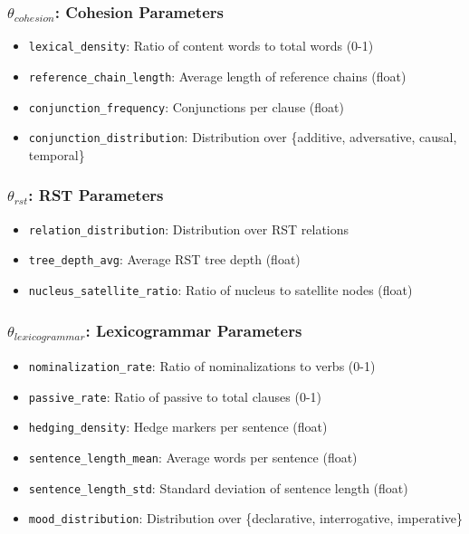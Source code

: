 \subsubsection{$\theta_{cohesion}$: Cohesion Parameters}

\begin{itemize}
    \item \texttt{lexical\_density}: Ratio of content words to total words (0-1)
    \item \texttt{reference\_chain\_length}: Average length of reference chains (float)
    \item \texttt{conjunction\_frequency}: Conjunctions per clause (float)
    \item \texttt{conjunction\_distribution}: Distribution over \{additive, adversative, causal, temporal\}
\end{itemize}

\subsubsection{$\theta_{rst}$: RST Parameters}

\begin{itemize}
    \item \texttt{relation\_distribution}: Distribution over RST relations
    \item \texttt{tree\_depth\_avg}: Average RST tree depth (float)
    \item \texttt{nucleus\_satellite\_ratio}: Ratio of nucleus to satellite nodes (float)
\end{itemize}

\subsubsection{$\theta_{lexicogrammar}$: Lexicogrammar Parameters}

\begin{itemize}
    \item \texttt{nominalization\_rate}: Ratio of nominalizations to verbs (0-1)
    \item \texttt{passive\_rate}: Ratio of passive to total clauses (0-1)
    \item \texttt{hedging\_density}: Hedge markers per sentence (float)
    \item \texttt{sentence\_length\_mean}: Average words per sentence (float)
    \item \texttt{sentence\_length\_std}: Standard deviation of sentence length (float)
    \item \texttt{mood\_distribution}: Distribution over \{declarative, interrogative, imperative\}
\end{itemize}

